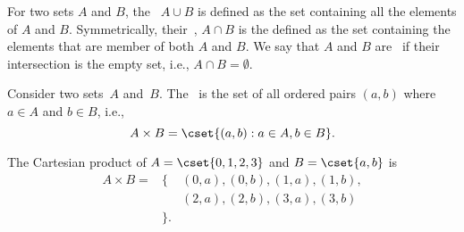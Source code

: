 \begin{cluster}
\label{grp:def:bg::sets-and-relations::union-and-intersection}

\begin{definition}
\label{def:bg::sets-and-relations::union-and-intersection}
For two sets $A$ and $B$, the~ $A \cup B$ is defined as
the set containing all the elements of $A$ and $B$.  Symmetrically,
their~, $A \cap B$ is the defined as the set
containing the elements that are member of both $A$ and $B$.
We say that $A$ and $B$ are~ if their intersection is
the empty set, i.e., $A \cap B = \emptyset$.

\end{definition}
\end{cluster}

\begin{flex}
\label{grp:def:bg::sets-and-relations::cartesian-product}

\begin{definition}
\label{def:bg::sets-and-relations::cartesian-product}
Consider two sets~$A$ and~$B$.  The~ is the set of all ordered pairs $(a,b)$ where $a \in A$ and $b
\in B$, i.e.,
\[
A \times B = \cset{(a,b) : a \in A, b \in B}.
\]

\end{definition}

\begin{example}
\label{ex:bg::sets::cartesian}
The Cartesian product of $A = \cset{0,1,2,3}$ and $B = \cset{a,b}$ is
\[
\begin{array}{lll}
A \times B = & \{ & (0,a),(0,b),(1,a),(1,b),
\\
             &    & (2,a),(2,b),(3,a),(3,b) 
\\
             & \}.
\end{array}
\]

\end{example}
\end{flex}

